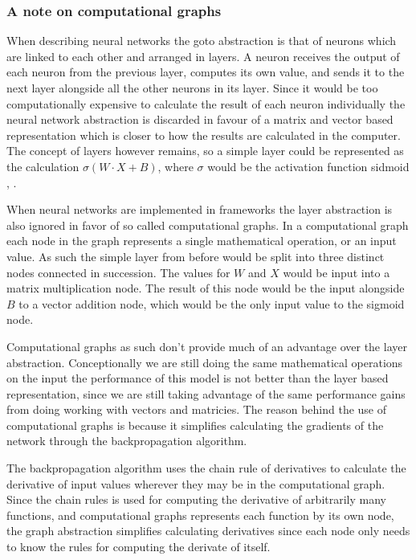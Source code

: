 \subsubsection*{A note on computational graphs}

When describing neural networks the goto abstraction is that of neurons which
are linked to each other and arranged in layers. A neuron receives the output of
each neuron from the previous layer, computes its own value, and sends it to the
next layer alongside all the other neurons in its layer. Since it would be too
computationally expensive to calculate the result of each neuron individually
the neural network abstraction is discarded in favour of a matrix and vector
based representation which is closer to how the results are calculated in the
computer. The concept of layers however remains, so a simple layer could be
represented as the calculation $\sigma(W \cdot X + B)$, where $\sigma$ would be
the activation function sidmoid \cite[Chapter~6.5.1]{goodfellow2016deep},
\cite[Chapter~5.1]{goldberg2017neural}.

When neural networks are implemented in frameworks the layer abstraction is also
ignored in favor of so called computational graphs. In a computational graph
each node in the graph represents a single mathematical operation, or an input
value. As such the simple layer from before would be split into three distinct
nodes connected in succession. The values for $W$ and $X$ would be input into a
matrix multiplication node. The result of this node would be the input alongside
$B$ to a vector addition node, which would be the only input value to the
sigmoid node. 

Computational graphs as such don't provide much of an advantage over the layer
abstraction. Conceptionally we are still doing the same mathematical operations
on the input the performance of this model is not better than the layer based
representation, since we are still taking advantage of the same performance
gains from doing working with vectors and matricies. The reason behind the use
of computational graphs is because it simplifies calculating the gradients of
the network through the backpropagation algorithm. 

The backpropagation algorithm uses the chain rule of derivatives to calculate
the derivative of input values wherever they may be in the computational graph.
Since the chain rules is used for computing the derivative of arbitrarily many
functions, and computational graphs represents each function by its own node,
the graph abstraction simplifies calculating derivatives since each node only
needs to know the rules for computing the derivate of itself.
 

